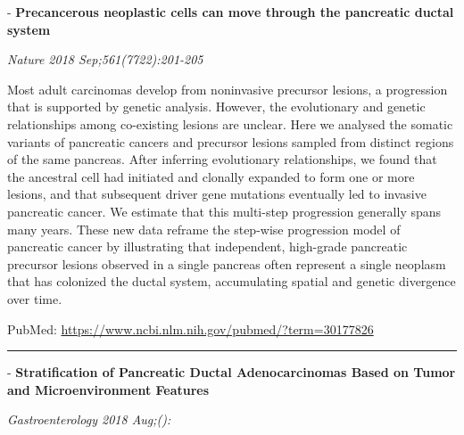 \documentclass[]{article}
\begin{document}
 - \textbf{Precancerous neoplastic cells can move through the pancreatic
ductal system}

\emph{Nature 2018 Sep;561(7722):201-205}

Most adult carcinomas develop from noninvasive precursor lesions, a
progression that is supported by genetic analysis. However, the
evolutionary and genetic relationships among co-existing lesions are
unclear. Here we analysed the somatic variants of pancreatic cancers and
precursor lesions sampled from distinct regions of the same pancreas.
After inferring evolutionary relationships, we found that the ancestral
cell had initiated and clonally expanded to form one or more lesions,
and that subsequent driver gene mutations eventually led to invasive
pancreatic cancer. We estimate that this multi-step progression
generally spans many years. These new data reframe the step-wise
progression model of pancreatic cancer by illustrating that independent,
high-grade pancreatic precursor lesions observed in a single pancreas
often represent a single neoplasm that has colonized the ductal system,
accumulating spatial and genetic divergence over time.

PubMed: \url{https://www.ncbi.nlm.nih.gov/pubmed/?term=30177826}

{}

{}

\begin{center}\rule{0.5\linewidth}{\linethickness}\end{center}

 - \textbf{Stratification of Pancreatic Ductal Adenocarcinomas Based on
Tumor and Microenvironment Features}

\emph{Gastroenterology 2018 Aug;():}
\end{document}
